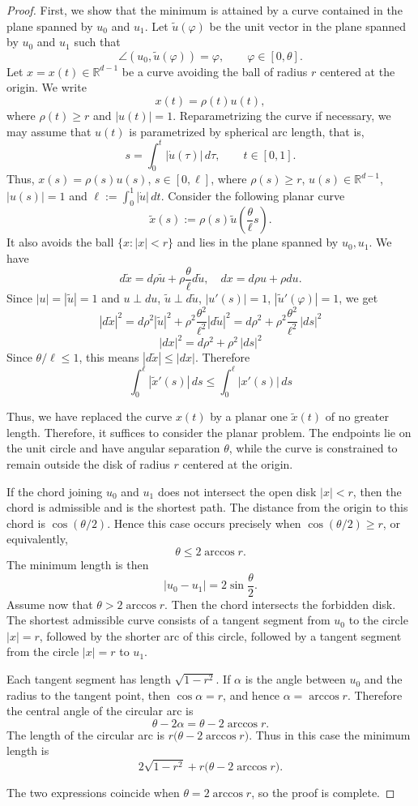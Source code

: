 \documentclass[10pt,a4paper]{amsart}
\begin{document}
\begin{proof}
First, we show that the minimum is attained by a curve contained in the plane spanned by \(u_0\) and \(u_1\). 
Let \(\tilde u(\varphi)\) be the unit vector in the plane spanned by \(u_0\) and \(u_1\) such that
\[
\angle(u_0,\tilde u(\varphi))=\varphi,
\qquad
\varphi\in[0,\theta].
\]
Let \(x=x(t)\in\mathbb R^{d-1}\) be a curve avoiding the ball of radius \(r\) centered at the origin. We write
\[
x(t)=\rho(t)u(t),
\]
where \(\rho(t)\ge r\) and \(|u(t)|=1\). Reparametrizing the curve if necessary, we may assume that \(u(t)\) is parametrized by spherical arc length, that is,
\[
s=\int_0^t |\dot u(\tau)|\,d\tau,
\qquad t\in[0,1].
\]
Thus, $x(s)=\rho(s)u(s)$, $s\in[0,\ell]$, where $\rho(s)\ge r$, $u(s)\in \mathbb{R}^{d-1}$, $|u(s)|=1$ and $\displaystyle \ell:=\int_0^1 |\dot{u}|\,dt$. Consider the following planar curve
\[
\tilde{x}(s):= \rho(s)\tilde{u}\left(\frac{\theta}{\ell} s\right).
\]
It also avoids the ball $\{x:|x|<r\}$ and lies in the plane spanned by $u_0,u_1$.
We have
\[
d\tilde{x} =d \rho \tilde{u}+\rho \frac{\theta}{\ell}d\tilde{u},\quad dx =d \rho u+\rho du.
\]
Since $|u|=|\tilde{u}|=1$ and $u\perp du$, $\tilde{u}\perp d \tilde{u}$, $|u'(s)|=1$, $|\tilde{u}'(\varphi)|=1$, we get
\[
|d\tilde{x}|^2=d\rho^2|\tilde{u}|^2+\rho^2 \frac{\theta^2}{\ell^2}|d\tilde{u}|^2=d\rho^2+\rho^2\frac{\theta^2}{\ell^2}\,|ds|^2
\]
\[
|dx|^2=d\rho^2+\rho^2\,|ds|^2
\]
Since $\displaystyle \theta/\ell\le 1$, this means $|d\tilde{x}|\le |dx|$. Therefore
\[
\int_0^{\ell}|\tilde{x}'(s)|\,ds\le \int_0^{\ell}|x'(s)|\,ds 
\]

Thus, we have replaced the curve $x(t)$ by a planar one $\tilde{x}(t)$ of no greater length. Therefore, it suffices to consider the planar problem. The endpoints lie on the unit circle and have angular separation \(\theta\), while the curve is constrained to remain outside the disk of radius \(r\) centered at the origin.

If the chord joining \(u_0\) and \(u_1\) does not intersect the open disk \(|x|<r\),
then the chord is admissible and is the shortest path. The distance from the origin
to this chord is \(\cos(\theta/2)\). Hence this case occurs precisely when $\cos(\theta/2)\ge r$, or equivalently,
\[
\theta\le 2\arccos r.
\]
The minimum length is then
\[
|u_0-u_1|=2\sin\frac{\theta}{2}.
\]
Assume now that $\theta>2\arccos r$.
Then the chord intersects the forbidden disk. The shortest admissible curve consists
of a tangent segment from \(u_0\) to the circle \(|x|=r\), followed by the shorter
arc of this circle, followed by a tangent segment from the circle \(|x|=r\) to \(u_1\).

Each tangent segment has length $\sqrt{1-r^2}$. If \(\alpha\) is the angle between \(u_0\) and the radius to the tangent point, then $\cos\alpha=r$, and hence $\alpha=\arccos r$. Therefore the central angle of the circular arc is
\[
\theta-2\alpha=\theta-2\arccos r. 
\]
The length of the circular arc is $r\bigl(\theta-2\arccos r\bigr)$. Thus in this case the minimum length is
\[
2\sqrt{1-r^2}+r\bigl(\theta-2\arccos r\bigr).
\]

The two expressions coincide when \(\theta=2\arccos r\), so the proof is complete.
\end{proof}
\end{document}
